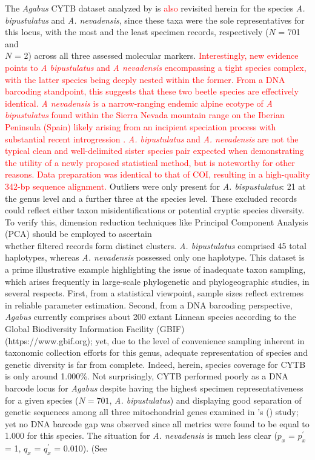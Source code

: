 \documentclass[12pt]{article}
\begin{document}
The \textit{Agabus} CYTB dataset analyzed by \citet{phillips2024measure} is \textcolor{red}{also} revisited herein for the species \textit{A. bipustulatus} and \textit{A. nevadensis}, since these taxa were the sole representatives for this locus, with the most and the least specimen records, respectively ($N$ = 701 and \\ $N$ = 2) across all three assessed molecular markers. \textcolor{red}{Interestingly, new evidence \citep{pallares2024genomic} points to \textit{A bipustulatus} and \textit{A nevadensis} encompassing a tight species complex, with the latter species being deeply nested within the former. From a DNA barcoding standpoint, this suggests that these two beetle species are effectively identical. \textit{A nevadensis} is a narrow-ranging endemic alpine ecotype of \textit{A bipustulatus} found within the Sierra Nevada mountain range on the Iberian Peninsula (Spain) likely arising from an incipient speciation process with substantial recent introgression \citep{pallares2024genomic}. \textit{A. bipustulatus} and \textit{A. nevadensis} are not the typical clean and well-delimited sister species pair expected when demonstrating the utility of a newly proposed statistical method, but is noteworthy for other reasons. Data preparation was identical to that of COI, resulting in a high-quality 342-bp sequence alignment.} Outliers were only present for \textit{A. bispustulatus}: 21 at the genus level and a further three at the species level. These excluded records could reflect either taxon misidentifications or potential cryptic species diversity. To verify this, dimension reduction techniques like Principal Component Analysis (PCA) should be employed to ascertain \\ whether filtered records form distinct clusters. \textit{A. bipustulatus} comprised 45 total haplotypes, whereas \textit{A. nevadensis} possessed only one haplotype. This dataset is a prime illustrative example highlighting the issue of inadequate taxon sampling, which arises frequently in large-scale phylogenetic and phylogeographic studies, in several respects. First, from a statistical viewpoint, sample sizes reflect extremes in reliable parameter estimation. Second, from a DNA barcoding perspective, \textit{Agabus} currently comprises about 200 extant Linnean species according to the Global Biodiversity Information Facility (GBIF) \\ (https://www.gbif.org); yet, due to the level of convenience sampling inherent in taxonomic collection efforts for this genus, adequate representation of species and genetic diversity is far from complete. Indeed, herein, species coverage for CYTB is only around 1.000\%. Not surprisingly, CYTB performed poorly as a DNA barcode locus for \textit{Agabus} despite having the highest specimen representativeness for a given species ($N = 701$, \textit{A. bipustulatus}) and displaying good separation of genetic sequences among all three mitochondrial genes examined in \citeauthor{phillips2024measure}'s (\citeyear{phillips2024measure}) study; yet no DNA barcode gap was observed since all metrics were found to be equal to 1.000 for this species. The situation for \textit{A. nevadensis} is much less clear ($p_x$ = $p^{'}_x$ = 1, $q_x$ = $q^{'}_x$ = 0.010). (See 
\end{document}
